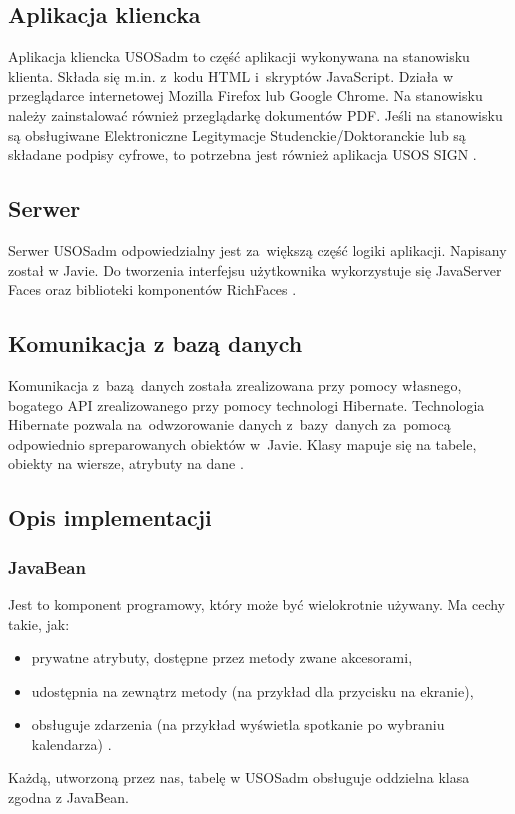 \documentclass[licencjacka]{pracamgr}
\begin{document}

\subsection{Aplikacja kliencka}
Aplikacja kliencka USOSadm to część aplikacji wykonywana na stanowisku klienta. Składa się m.in. z~kodu HTML i~skryptów JavaScript. Działa w przeglądarce internetowej Mozilla Firefox lub Google Chrome. Na stanowisku należy zainstalować również przeglądarkę dokumentów PDF. Jeśli na stanowisku są obsługiwane Elektroniczne Legitymacje Studenckie/Doktoranckie lub są składane podpisy cyfrowe, to potrzebna jest również aplikacja USOS SIGN \cite{wdr}.

\subsection{Serwer}
Serwer USOSadm odpowiedzialny jest za~większą część logiki aplikacji. Napisany został w Javie. Do tworzenia interfejsu użytkownika wykorzystuje się JavaServer Faces oraz biblioteki komponentów RichFaces \cite{wikijsf}.

\subsection{Komunikacja z bazą danych}
Komunikacja z~bazą~danych została zrealizowana przy pomocy własnego, bogatego API zrealizowanego przy pomocy technologi Hibernate. Technologia Hibernate pozwala na~odwzorowanie danych z~bazy~danych za~pomocą odpowiednio spreparowanych obiektów w~Javie. Klasy mapuje się na tabele, obiekty na wiersze, atrybuty na dane \cite{hibernate}.

\subsection{Opis implementacji}

\subsubsection{JavaBean}
Jest to komponent programowy, który może być wielokrotnie używany. Ma cechy takie, jak:
\begin{itemize}
\item prywatne atrybuty, dostępne przez metody zwane akcesorami,
\item udostępnia na zewnątrz metody (na przykład dla przycisku na ekranie),
\item obsługuje zdarzenia (na przykład wyświetla spotkanie po wybraniu kalendarza) \cite{javabean}.
\end{itemize}
Każdą, utworzoną przez nas, tabelę w USOSadm obsługuje oddzielna klasa zgodna z JavaBean.
\end{document}
